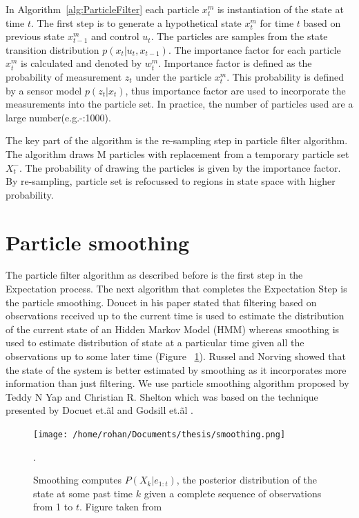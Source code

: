 \documentclass[12pt]{dalcsthesis}
\begin{document}
In Algorithm~\ref{alg:ParticleFilter} each particle $x_{t}^{m}$ is instantiation of the state at time $t$.  The first step is to generate a hypothetical state $x_{t}^{m}$ for time $t$ based on previous state $x_{t-1}^{m}$ and control $u_{t}$. The particles are samples from the state transition distribution $p(x_{t}|u_{t},x_{t-1})$. The importance factor for each particle $x_{t}^{m}$ is calculated and denoted by $w_{t}^{m}$. Importance factor is defined as the probability of measurement $z_{t}$ under the particle $x_{t}^{m}$. This probability is defined by a sensor model $p(z_{t}|x_{t})$, thus importance factor are used to incorporate the measurements into the particle set. In practice, the number of particles used are a large number(e.g.-:1000).

The key part of the algorithm is the re-sampling step in particle filter algorithm. The algorithm draws M particles with replacement from a temporary particle set $X_{t}^{-}$. The probability of drawing the particles is given by the importance factor. By re-sampling, particle set is refocussed to regions in state space with higher probability.

\section{Particle smoothing}
\label{ch-: particle smoothing}
The particle filter algorithm as described before is the first step in the Expectation process. The next algorithm that completes the Expectation Step is the particle smoothing. Doucet \cite{doucet2009tutorial} in his paper stated that filtering based on observations received up to the current time is used to estimate the distribution of the current state of an Hidden Markov Model (HMM) whereas smoothing is used to estimate distribution of state at a particular time given all the observations up to some later time (Figure ~\ref{fig: particle smoothing}). Russel and Norving \cite{russell2003artificial} showed that the state of the system is better estimated by smoothing as it incorporates more information than just filtering. We use particle smoothing algorithm proposed by Teddy N Yap and Christian R. Shelton \cite{Yap2008} which was based on the technique presented by Docuet et.\~al \cite{doucet2000monte} and Godsill et.\~al \cite{Godsill2004}.
\begin{figure}
\centering
{\texttt{[image: /home/rohan/Documents/thesis/smoothing.png]}}

\caption{\label{fig: particle smoothing} Smoothing computes $P(X_{k}|e_{1:t})$, the posterior distribution of the state at some past time $k$ given a complete sequence of observations from 1 to $t$. Figure taken from \cite{russell2003artificial}}.
\end{figure}
\end{document}
